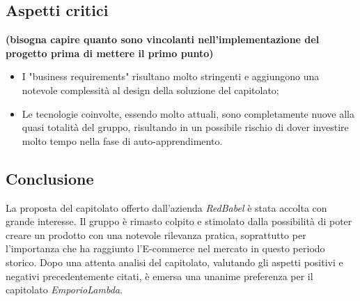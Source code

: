 \subsection{Aspetti critici}{
\textbf{(bisogna capire quanto sono vincolanti nell'implementazione del progetto prima di mettere il primo punto)}
\begin{itemize}
\item I "business requirements" risultano molto stringenti e aggiungono una notevole complessità al design della soluzione del capitolato;
\item Le tecnologie coinvolte, essendo molto attuali, sono completamente nuove alla quasi totalità del gruppo, risultando in un possibile rischio di dover investire molto tempo nella fase di auto-apprendimento.
\end{itemize}
}

\subsection{Conclusione}{
La proposta del capitolato offerto dall'azienda \textit{RedBabel} è stata accolta con grande interesse. Il gruppo è rimasto colpito e stimolato dalla possibilità di poter creare un prodotto con una notevole rilevanza pratica, soprattutto per l'importanza che ha raggiunto l'E-commerce nel mercato in questo periodo storico. Dopo una attenta analisi del capitolato, valutando gli aspetti positivi e negativi precedentemente citati, è emersa una unanime preferenza per il capitolato \textit{EmporioLambda}.
}

